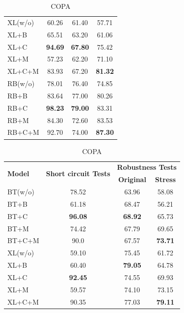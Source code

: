 \begin{table}[t!]
\begin{subtable}[t]{0.48\textwidth}
\begin{tabular}{l|c|cc}
			\rowcolor{Gray}
			XL(w/o)&60.26&61.40&57.71\\
			XL+B&65.51&63.20&61.06\\
			XL+C&\textbf{94.69}&\textbf{67.80}&75.42\\
			XL+M&57.23&62.20&71.10\\
			XL+C+M&83.93&67.20&\textbf{81.32}\\
			
			\midrule
			
			\rowcolor{Gray}
			RB(w/o)&78.01&76.40&74.85\\
			RB+B&83.64&77.00&80.26\\
			RB+C&\textbf{98.23}&\textbf{79.00}&83.31\\
			RB+M&84.30&72.60&83.53\\
			RB+C+M&92.70&74.00&\textbf{87.30}\\
			\bottomrule
		\end{tabular}
		\caption{COPA}
	\end{subtable} 
	\hfill
	\begin{subtable}[t]{0.48\textwidth}
		\centering
		\begin{tabular}{l|c|cc}\toprule
			\multirow{2}{*}{\textbf{Model}}& \multirow{2}{*}{\bf Short circuit Tests} & \multicolumn{2}{c}{\bf Robustness Tests} \\ \cline{3-4}
			& & \textbf{Original} &\textbf{Stress}\\ \hline
			\rowcolor{Gray}
			BT(w/o)&78.52&63.96&58.08\\
			BT+B&61.18&68.47&56.21\\
			BT+C&\textbf{96.08}&\textbf{68.92}&65.73\\
			BT+M&74.42&67.79&69.65\\
			BT+C+M&90.0&67.57&\textbf{73.71}\\
			\midrule
			
			\rowcolor{Gray}
			XL(w/o)&59.10&75.45&61.72\\
			XL+B&60.40&\textbf{79.05}&64.78\\
			XL+C&\textbf{92.45}&74.55&69.93\\
			XL+M&59.57&74.10&73.15\\
			XL+C+M&90.35&77.03&\textbf{79.11}\\
			\midrule
			

\end{tabular}
\end{subtable}
\end{table}
